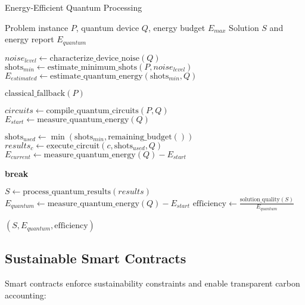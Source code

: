 \documentclass[10pt,journal,compsoc]{IEEEtran}
\begin{document}
\begin{algorithm}[!t]
\caption{Energy-Efficient Quantum Processing}
\label{alg:quantum_processing}
\begin{algorithmic}[1]
\Require Problem instance $P$, quantum device $Q$, energy budget $E_{max}$
\Ensure Solution $S$ and energy report $E_{quantum}$

\State $noise_{level} \leftarrow \text{characterize\_device\_noise}(Q)$
\State $\text{shots}_{min} \leftarrow \text{estimate\_minimum\_shots}(P, noise_{level})$
\State $E_{estimated} \leftarrow \text{estimate\_quantum\_energy}(\text{shots}_{min}, Q)$

    \State \Return $\text{classical\_fallback}(P)$
\EndIf

\State $circuits \leftarrow \text{compile\_quantum\_circuits}(P, Q)$
\State $E_{start} \leftarrow \text{measure\_quantum\_energy}(Q)$

    \State $\text{shots}_{used} \leftarrow \min(\text{shots}_{min}, \text{remaining\_budget}())$
    \State $results_c \leftarrow \text{execute\_circuit}(c, \text{shots}_{used}, Q)$
    \State $E_{current} \leftarrow \text{measure\_quantum\_energy}(Q) - E_{start}$
    
        \State \textbf{break} 
    \EndIf
\EndFor

\State $S \leftarrow \text{process\_quantum\_results}(results)$
\State $E_{quantum} \leftarrow \text{measure\_quantum\_energy}(Q) - E_{start}$
\State $\text{efficiency} \leftarrow \frac{\text{solution\_quality}(S)}{E_{quantum}}$

\State \Return $(S, E_{quantum}, \text{efficiency})$
\end{algorithmic}
\end{algorithm}

\subsection{Sustainable Smart Contracts}

Smart contracts enforce sustainability constraints and enable transparent carbon accounting:
\end{document}

